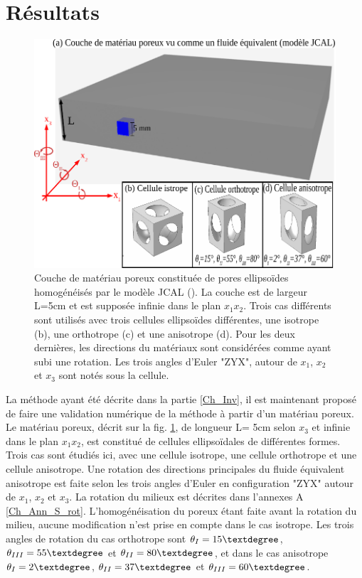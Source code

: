 \documentclass[twoside,openright]{report}
\begin{document}
\section{Résultats}
  \begin{figure}[ht!]
        \centering
        \includegraphics{Material_2.pdf}
        \caption{Couche de matériau poreux constituée de pores ellipsoïdes homogénéisés par le modèle JCAL (\cite{Johnson}\cite{Lafarge}\cite{Allard}). La couche est de largeur L=5cm et est supposée infinie dans le plan $x_1x_2$. Trois cas différents sont utilisés avec trois cellules ellipsoïdes différentes, une isotrope (b), une orthotrope (c) et une anisotrope (d). Pour les deux dernières, les directions du matériaux sont considérées comme ayant subi une rotation. Les trois angles d'Euler "ZYX", autour de $x_1$, $x_2$ et $x_3$ sont notés sous la cellule. }
        \label{Porous_Mat}
    \end{figure}

    La méthode ayant été décrite dans la partie \ref{Ch_Inv}, il est maintenant proposé de faire une validation numérique de la méthode à partir d'un matériau poreux. Le matériau poreux, décrit sur la fig. \ref{Porous_Mat}, de longueur L= 5cm selon $x_3$ et infinie dans le plan $x_1x_2$, est constitué de cellules ellipsoïdales de différentes formes. Trois cas sont étudiés ici, avec une cellule isotrope, une cellule orthotrope et une cellule anisotrope. Une rotation des directions principales du fluide équivalent anisotrope est faite selon les trois angles d'Euler en configuration "ZYX" autour de $x_1$, $x_2$ et $x_3$. La rotation du milieux est décrites dans l'annexes A \ref{Ch_Ann_S_rot}. L'homogénéisation du poreux étant faite avant la rotation du milieu, aucune modification n'est prise en compte dans le cas isotrope. Les trois angles de rotation du cas orthotrope sont $\theta_I=15\textdegree$, $\theta_{III}=55\textdegree$ et $\theta_{II}=80\textdegree$, et dans le cas anisotrope $\theta_I=2\textdegree$, $\theta_{II}=37\textdegree$ et $\theta_{III}=60\textdegree$.
    
\end{document}
